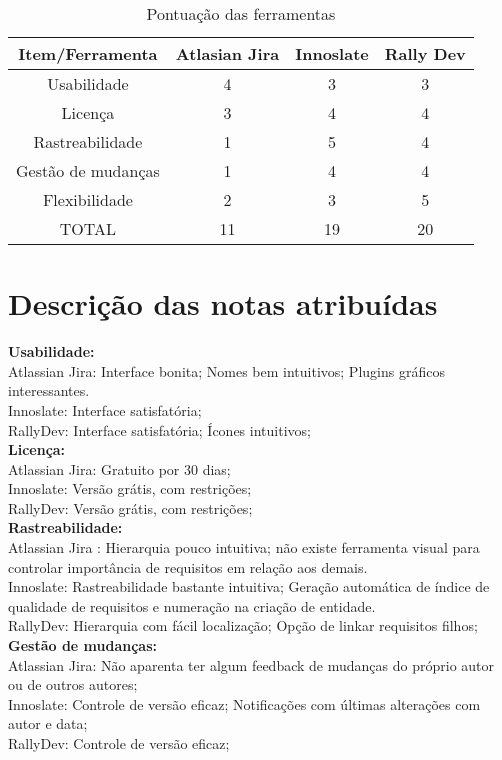 \begin{table}[h]
\centering
\vspace{0.5cm}
\begin{tabular}{ c | c | c | c } \hline
Item/Ferramenta & Atlasian Jira  & Innoslate & Rally Dev \\ \hline
Usabilidade & 4 & 3 & 3 \\ \hline
Licença & 3 & 4 & 4 \\ \hline
Rastreabilidade & 1 & 5 & 4 \\ \hline
Gestão de mudanças & 1 & 4 & 4 \\ \hline
Flexibilidade & 2 & 3 & 5  \\ \hline
TOTAL & 11 & 19 & 20 \\ \hline
\end{tabular}
\caption{Pontuação das ferramentas}
\end{table}

\section {\large{Descrição das notas atribuídas}}

\textbf{Usabilidade:}\\
\tab Atlassian Jira: Interface bonita; Nomes bem intuitivos; Plugins gráficos interessantes.\\
\tab Innoslate: Interface satisfatória; \\
\tab RallyDev: Interface satisfatória; Ícones intuitivos;\\

\textbf{Licença:}\\
\tab Atlassian Jira: Gratuito por 30 dias;\\
\tab Innoslate: Versão grátis, com restrições;\\
\tab RallyDev: Versão grátis, com restrições;\\

\textbf{Rastreabilidade:}\\
\tab Atlassian Jira : Hierarquia pouco intuitiva; não existe ferramenta visual para controlar importância de requisitos em relação aos demais.\\
\tab Innoslate: Rastreabilidade bastante intuitiva; Geração automática de índice de qualidade de requisitos e numeração na criação de entidade.\\
\tab RallyDev: Hierarquia com fácil localização; Opção de linkar requisitos filhos;\\

\textbf{Gestão de mudanças:}\\
\tab Atlassian Jira: Não aparenta ter algum feedback de mudanças do próprio autor ou de outros autores;\\
\tab Innoslate: Controle de versão eficaz; Notificações com últimas alterações com autor e data;\\
\tab RallyDev: Controle de versão eficaz;\\

